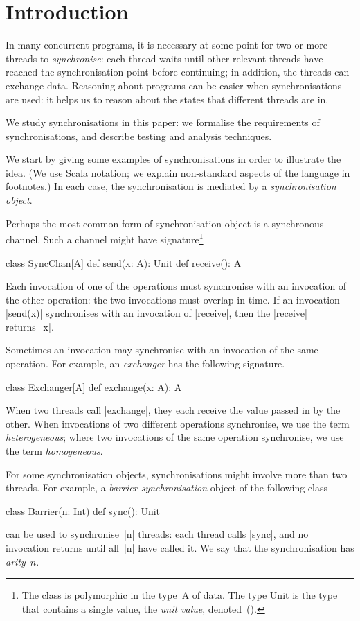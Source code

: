\section{Introduction}

In many concurrent programs, it is necessary at some point for two or more
threads to \emph{synchronise}: each thread waits until other relevant threads
have reached the synchronisation point before continuing; in addition, the
threads can exchange data.  Reasoning about programs can be easier when
synchronisations are used: it helps us to reason about the states that
different threads are in.

We study synchronisations in this paper: we formalise the requirements of
synchronisations, and describe testing and analysis techniques.

We start by giving some examples of synchronisations in order to illustrate
the idea.  (We use Scala notation; we explain non-standard aspects of the
language in footnotes.)  In each case, the synchronisation is mediated by a
\emph{synchronisation object}.

Perhaps the most common form of synchronisation object is a synchronous
channel.  Such a channel might have signature\footnote{The class is
  polymorphic in the type~{\scalashape A} of data.  The type {\scalashape
    Unit} is the type that contains a single value, the \emph{unit value},
  denoted~{\scalashape ()}.}
%
\begin{scala}
class SyncChan[A]{
  def send(x: A): Unit
  def receive(): A
}
\end{scala}
%
Each invocation of one of the operations must synchronise with an invocation
of the other operation: the two invocations must overlap in time.  If an
invocation |send(x)| synchronises with an invocation of |receive|, then the
|receive| returns~|x|.

Sometimes an invocation may synchronise with an invocation of the same
operation.  For example, an \emph{exchanger} has the following signature.
%
\begin{scala}
class Exchanger[A]{
  def exchange(x: A): A
}
\end{scala}
%
When two threads call |exchange|, they each receive the value passed in by the
other.  When invocations of two different operations synchronise, we use the
term \emph{heterogeneous}; where two invocations of the same operation
synchronise, we use the term \emph{homogeneous}.  

For some synchronisation objects, synchronisations might involve more than two
threads.  For example, a \emph{barrier synchronisation} object of the
following class
%
\begin{scala}
class Barrier(n: Int){
  def sync(): Unit
}
\end{scala}
%
can be used to synchronise~|n| threads: each thread calls |sync|, and no
invocation returns until all~|n| have called it.  We say that the
synchronisation has \emph{arity}~$n$.

